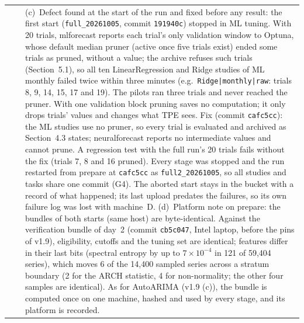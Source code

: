 \documentclass[11pt,a4paper]{article}
\newcommand{\code}[1]{\texttt{#1}}
\begin{document}
\begin{longtable}{@{}p{1.3cm} p{1.9cm} p{11.8cm}@{}}
 & & (c)~Defect found at the start of the run and fixed before any result: the first start (\mbox{\code{full_20261005}}, commit \code{191940c}) stopped in ML tuning. With 20 trials, mlforecast reports each trial's only validation window to Optuna, whose default median pruner (active once five trials exist) ended some trials as pruned, without a value; the archive refuses such trials (Section~5.1), so all ten LinearRegression and Ridge studies of ML monthly failed twice within three minutes (e.g.\ \code{Ridge|monthly|raw}: trials 8, 9, 14, 15, 17 and 19). The pilots ran three trials and never reached the pruner. With one validation block pruning saves no computation; it only drops trials' values and changes what TPE sees. Fix (commit \code{cafc5cc}): the ML studies use no pruner, so every trial is evaluated and archived as Section~4.3 states; neuralforecast reports no intermediate values and cannot prune. A regression test with the full run's 20 trials fails without the fix (trials 7, 8 and 16 pruned). Every stage was stopped and the run restarted from prepare at \code{cafc5cc} as \mbox{\code{full2_20261005}}, so all studies and tasks share one commit (G4). The aborted start stays in the bucket with a record of what happened; its last upload predates the failures, so its own failure log was lost with machine~D. (d)~Platform note on prepare: the bundles of both starts (same host) are byte-identical. Against the verification bundle of day~2 (commit \code{cb5c047}, Intel laptop, before the pins of v1.9), eligibility, cutoffs and the tuning set are identical; features differ in their last bits (spectral entropy by up to $7\times10^{-4}$ in 121 of 59,404 series), which moves 6 of the 14,400 sampled series across a stratum boundary (2 for the ARCH statistic, 4 for non-normality; the other four samples are identical). As for AutoARIMA (v1.9 (c)), the bundle is computed once on one machine, hashed and used by every stage, and its platform is recorded. \\

\end{longtable}
\end{document}
